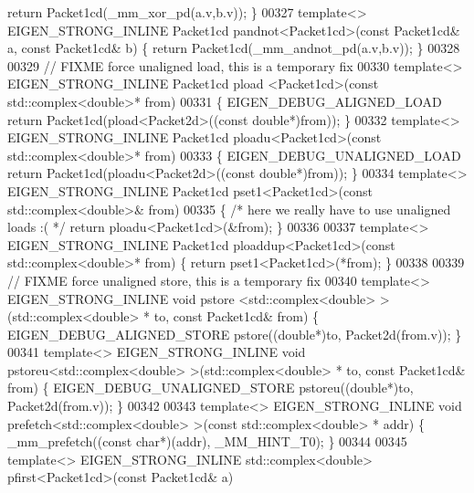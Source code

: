 \begin{DoxyCode}
{      return} Packet1cd(\_mm\_xor\_pd(a.v,b.v)); \}
00327 \textcolor{keyword}{template}<> EIGEN\_STRONG\_INLINE Packet1cd pandnot<Packet1cd>(\textcolor{keyword}{const} Packet1cd& a, \textcolor{keyword}{const} Packet1cd& b) \{ \textcolor{keywordflow}{
      return} Packet1cd(\_mm\_andnot\_pd(a.v,b.v)); \}
00328 
00329 \textcolor{comment}{// FIXME force unaligned load, this is a temporary fix}
00330 \textcolor{keyword}{template}<> EIGEN\_STRONG\_INLINE Packet1cd pload <Packet1cd>(\textcolor{keyword}{const} std::complex<double>* from)
00331 \{ EIGEN\_DEBUG\_ALIGNED\_LOAD \textcolor{keywordflow}{return} Packet1cd(pload<Packet2d>((\textcolor{keyword}{const} \textcolor{keywordtype}{double}*)from)); \}
00332 \textcolor{keyword}{template}<> EIGEN\_STRONG\_INLINE Packet1cd ploadu<Packet1cd>(\textcolor{keyword}{const} std::complex<double>* from)
00333 \{ EIGEN\_DEBUG\_UNALIGNED\_LOAD \textcolor{keywordflow}{return} Packet1cd(ploadu<Packet2d>((\textcolor{keyword}{const} \textcolor{keywordtype}{double}*)from)); \}
00334 \textcolor{keyword}{template}<> EIGEN\_STRONG\_INLINE Packet1cd pset1<Packet1cd>(\textcolor{keyword}{const} std::complex<double>&  from)
00335 \{ \textcolor{comment}{/* here we really have to use unaligned loads :( */} \textcolor{keywordflow}{return} ploadu<Packet1cd>(&from); \}
00336 
00337 \textcolor{keyword}{template}<> EIGEN\_STRONG\_INLINE Packet1cd ploaddup<Packet1cd>(\textcolor{keyword}{const} std::complex<double>* from) \{ \textcolor{keywordflow}{return} 
      pset1<Packet1cd>(*from); \}
00338 
00339 \textcolor{comment}{// FIXME force unaligned store, this is a temporary fix}
00340 \textcolor{keyword}{template}<> EIGEN\_STRONG\_INLINE \textcolor{keywordtype}{void} pstore <std::complex<double> >(std::complex<double> *   to, \textcolor{keyword}{const} 
      Packet1cd& from) \{ EIGEN\_DEBUG\_ALIGNED\_STORE pstore((\textcolor{keywordtype}{double}*)to, Packet2d(from.v)); \}
00341 \textcolor{keyword}{template}<> EIGEN\_STRONG\_INLINE \textcolor{keywordtype}{void} pstoreu<std::complex<double> >(std::complex<double> *   to, \textcolor{keyword}{const} 
      Packet1cd& from) \{ EIGEN\_DEBUG\_UNALIGNED\_STORE pstoreu((\textcolor{keywordtype}{double}*)to, Packet2d(from.v)); \}
00342 
00343 \textcolor{keyword}{template}<> EIGEN\_STRONG\_INLINE \textcolor{keywordtype}{void} prefetch<std::complex<double> >(\textcolor{keyword}{const} std::complex<double> *   addr) \{ 
      \_mm\_prefetch((\textcolor{keyword}{const} \textcolor{keywordtype}{char}*)(addr), \_MM\_HINT\_T0); \}
00344 
00345 \textcolor{keyword}{template}<> EIGEN\_STRONG\_INLINE std::complex<double>  pfirst<Packet1cd>(\textcolor{keyword}{const} Packet1cd& a)

\end{DoxyCode}
